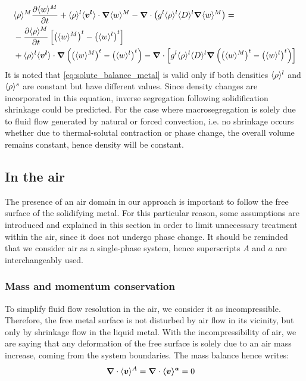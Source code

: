 \begin{align}
\label{eq:solute_balance_metal}
\begin{split}
 & \langle \rho \rangle^M \frac{\partial \langle w \rangle^M}{\partial t}   + \langle \rho \rangle^l  \langle \boldsymbol{v^l} \rangle \cdot \boldsymbol{\nabla} \langle w \rangle^M - \boldsymbol{\nabla} \cdot \left( {g^l} \langle \rho \rangle^l \langle D \rangle^l \boldsymbol{\nabla} \langle w \rangle^M \right)=\\
 &	 - \frac{\partial \langle \rho \rangle^M}{\partial t}  \left[ \left( \langle w \rangle^M \right)^t - \left( \langle w \rangle^l \right)^t \right] \\ 
 &	 + \langle \rho \rangle^l \langle \boldsymbol{v^l} \rangle \cdot \boldsymbol{\nabla} \left( \left( \langle w \rangle^M \right)^t -\left( \langle w \rangle^l \right)^t \right)
 	 - \boldsymbol{\nabla} \cdot \left[ {g^l} \langle \rho \rangle^l \langle D \rangle^l  \boldsymbol{\nabla} \left( \left( \langle w \rangle^M \right)^t -\left( \langle w \rangle^l \right)^t \right)  \right]
  \end{split}
  \end{align}
It is noted that \cref{eq:solute_balance_metal} is valid only if both densities $\langle \rho \rangle^l$ and $\langle \rho \rangle^s$
are constant but have different values. Since density changes are incorporated in this equation, 
inverse segregation following solidification shrinkage could be predicted.
For the case where macrosegregation is solely due to fluid flow generated by natural or forced convection, 
i.e. no shrinkage occurs whether due to thermal-solutal contraction or phase change, 
the overall volume remains constant, hence density will be constant.
\subsection{In the air}
The presence of an air domain in our approach is important to follow the free surface of the solidifying metal.
For this particular reason, some assumptions are introduced and explained in this section in order to limit unnecessary treatment within
the air, since it does not undergo phase change. It should be reminded that we consider air as a single-phase system, hence superscripts $A$ and $a$
are interchangeably used. 
\subsubsection{Mass and momentum conservation}
To simplify fluid flow resolution in the air, we consider it as incompressible.
Therefore, the free metal surface is not 
disturbed by air flow in its vicinity, but only by shrinkage flow in the liquid metal. With the incompressibility of air, we are saying that any deformation of the free surface 
is solely due to an air mass increase, coming from the system boundaries. The mass balance hence writes:
\begin{align}
\label{eq:mass_balance_air}
& \boldsymbol{\nabla} \cdot \langle \boldsymbol{v} \rangle^A = \boldsymbol{\nabla} \cdot \boldsymbol{\langle v \rangle^a} = 0
\end{align}

